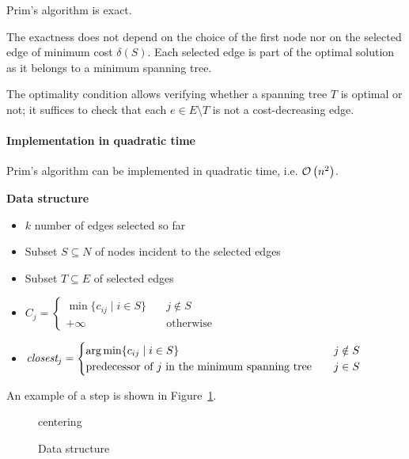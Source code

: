 \documentclass[english]{article}
\begin{document}
\begin{proposition}
  Prim's algorithm is exact.
\end{proposition}

The exactness does not depend on the choice of the first node nor on the selected edge of minimum cost \(\delta(S)\).
Each selected edge is part of the optimal solution as it belongs to a minimum spanning tree.

The optimality condition allows verifying whether a spanning tree \(T\) is optimal or not;
it suffices to check that each \(e \in E \setminus T\) is not a cost-decreasing edge.

\paragraph{Implementation in quadratic time}

Prim's algorithm can be implemented in quadratic time, i.e. \(\mathcal{O}\left(n^2\right)\).

\textbf{Data structure}
\begin{itemize}[itemsep=0.25ex]
  \item \(k\) number of edges selected so far
  \item Subset \(S \subseteq N\) of nodes incident to the selected edges
  \item Subset \(T \subseteq E\) of selected edges
  \item \(C_j = \begin{cases} \min \{c_{ij} \mid   i \in S\} \quad &j \notin S \\ +\infty &\text{otherwise}\end{cases}\)
  \item \(\textit{closest}_j = \begin{cases} \operatorname*{arg\,min}\{c_{ij} \mid   i \in S\}  & j \notin S \\ \text{predecessor of } j \text{ in the minimum spanning tree} \quad& j \in S \end{cases}\)
\end{itemize}

\bigskip
An example of a step is shown in Figure~\ref{fig:prim-quadratic-data-structure}.

\begin{figure}[htbp]
  \centering
  \bigskip
  centering
  \caption{Data structure}
  \label{fig:prim-quadratic-data-structure}
  \bigskip
\end{figure}
\end{document}
